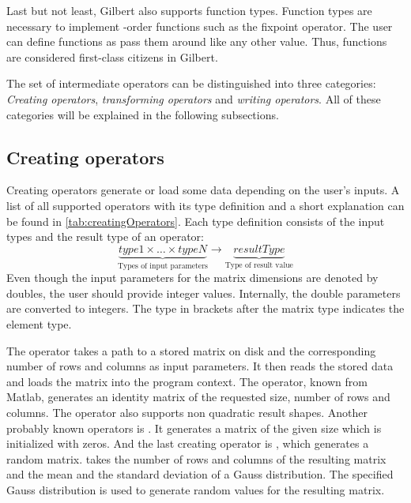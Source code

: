 Last but not least, Gilbert also supports function types.
Function types are necessary to implement -order functions such as the fixpoint operator.
The user can define functions as pass them around like any other value.
Thus, functions are considered first-class citizens in Gilbert.

The set of intermediate operators can be distinguished into three categories: \emph{Creating operators}, \emph{transforming operators} and \emph{writing operators}.
All of these categories will be explained in the following subsections.

\subsection{Creating operators}

Creating operators generate or load some data depending on the user's inputs.
A list of all supported operators with its type definition and a short explanation can be found in \cref{tab:creatingOperators}.
Each type definition consists of the input types and the result type of an operator:
\begin{displaymath}
	\underbrace{type1 \times \ldots \times typeN}_{\text{Types of input parameters}} \rightarrow \underbrace{resultType}_{\text{Type of result value}}
\end{displaymath}
Even though the input parameters for the matrix dimensions are denoted by doubles, the user should provide integer values.
Internally, the double parameters are converted to integers.
The type in brackets after the matrix type indicates the element type.

The  operator takes a path to a stored matrix on disk and the corresponding number of rows and columns as input parameters.
It then reads the stored data and loads the matrix into the program context.
The  operator, known from Matlab, generates an identity matrix of the requested size, number of rows and columns.
The operator also supports non quadratic result shapes.
Another probably known operators is .
It generates a matrix of the given size which is initialized with zeros.
And the last creating operator is , which generates a random matrix.
 takes the number of rows and columns of the resulting matrix and the mean and the standard deviation of a Gauss distribution.
The specified Gauss distribution is used to generate random values for the resulting matrix.

